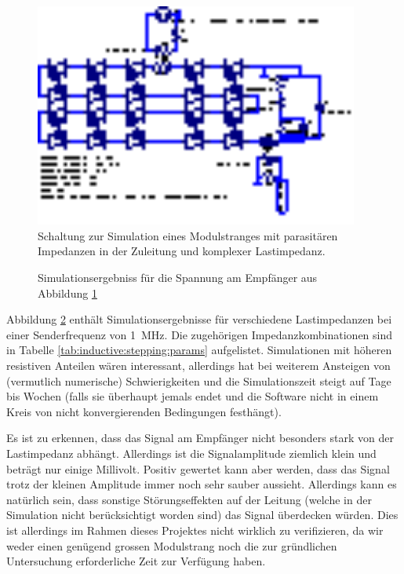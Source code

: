 \begin{figure}[h!tb]
    \centering
    \includegraphics[width=0.95\textwidth]{images/ltspice/jac/inductive.eps}
    \caption[Induktive Einkopplung, -Schaltung f\"ur Modulstrang]{%
        Schaltung  zur   Simulation  eines  Modulstranges   mit  parasit\"aren
        Impedanzen in der Zuleitung und komplexer Lastimpedanz.%
    }
    \label{fig:ltspice:inductive:complete}
\end{figure}

\begin{figure}[h!tb]
    
    \caption[Simulationsergebniss, induktive Einkopplung, Modulstrang]{%
        Simulationsergebniss f\"ur die Spannung am Empf\"anger aus Abbildung
        \ref{fig:ltspice:inductive:complete}%
    }
    \label{fig:simu:inductive:stepping}
\end{figure}

Abbildung  \ref{fig:simu:inductive:stepping}  enth\"alt  Simulationsergebnisse
f\"ur    verschiedene   Lastimpedanzen    bei    einer   Senderfrequenz    von
\SI{1}{\mega\hertz}.   Die zugeh\"origen Impedanzkombinationen sind in Tabelle
\ref{tab:inductive:stepping:params}  aufgelistet. Simulationen  mit  h\"oheren
resistiven  Anteilen w\"aren  interessant, allerdings  hat   bei
weiterem  Ansteigen von   (vermutlich  numerische) Schwierigkeiten
und  die Simulationszeit  steigt auf  Tage bis  Wochen (falls  sie \"uberhaupt
jemals endet und  die Software nicht in einem Kreis  von nicht konvergierenden
Bedingungen festh\"angt).

Es  ist  zu   erkennen,  dass  das  Signal  am   Empf\"anger  nicht  besonders
stark  von  der  Lastimpedanz abh\"angt. Allerdings  ist  die  Signalamplitude
ziemlich  klein  und betr\"agt  nur  einige  Millivolt. Positiv gewertet  kann
aber  werden,  dass  das  Signal   trotz  der  kleinen  Amplitude  immer  noch
sehr  sauber  aussieht. Allerdings kann  es  nat\"urlich  sein, dass  sonstige
St\"orungseffekten   auf  der   Leitung  (welche   in  der   Simulation  nicht
ber\"ucksichtigt  worden  sind)  das Signal  \"uberdecken  w\"urden. Dies  ist
allerdings  im Rahmen  dieses  Projektes nicht  wirklich  zu verifizieren,  da
wir  weder einen  gen\"ugend grossen  Modulstrang noch  die zur  gr\"undlichen
Untersuchung erforderliche Zeit zur Verf\"ugung haben.


